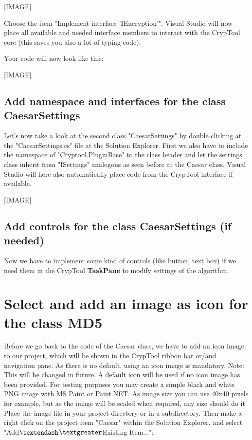 [IMAGE]

Choose the item "Implement interface 'IEncryption'". Visual Studio will now place all available and needed interface members to interact with the CrypTool core (this saves you also a lot of typing code).

Your code will now look like this:

[IMAGE]



\subsection{Add namespace and interfaces for the class CaesarSettings}\label{sec:AddNamespaceAndInterfacesForTheClassMD5Settings}
Let's now take a look at the second class "CaesarSettings" by double clicking at the "CaesarSettings.cs" file at the Solution Explorer. First we also have to include the namespace of "Cryptool.PluginBase" to the class header and let the settings class inherit from "ISettings" analogous as seen before at the Caesar class. Visual Studio will here also automatically place code from the CrypTool interface if available.

[IMAGE]

\subsection{Add controls for the class CaesarSettings (if needed)}\label{sec:AddControlsForTheClassMD5SettingsIfNeeded}
Now we have to implement some kind of controls (like button, text box) if we need them in the CrypTool \textbf{TaskPane} to modify settings of the algorithm.

\section{Select and add an image as icon for the class MD5}\label{sec:SelectAndAddAnImageAsIconForTheClassMD5}
Before we go back to the code of the Caesar class, we have to add an icon image to our project, which will be shown in the CrypTool ribbon bar or/and navigation pane. As there is no default, using an icon image is mandatory.
Note: This will be changed in future. A default icon will be used if no icon image has been provided.
For testing purposes you may create a simple black and white PNG image with MS Paint or Paint.NET. As image size you can use 40x40 pixels for example, but as the image will be scaled when required, any size should do it. Place the image file in your project directory or in a subdirectory. Then make a right click on the project item "Caesar" within the Solution Explorer, and select "Add$\textendash$$\textgreater$Existing Item...":

